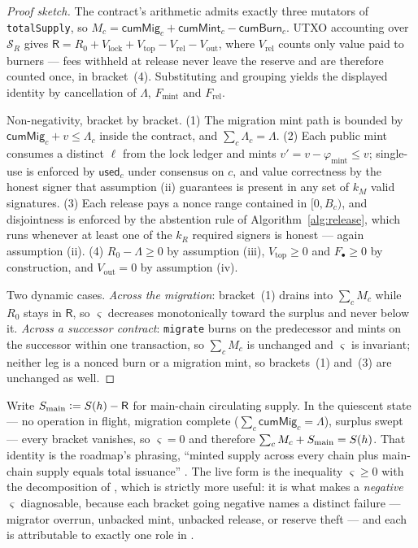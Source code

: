 \begin{proof}[Proof sketch]
The contract's arithmetic admits exactly three mutators of \texttt{totalSupply}, so
$M_c = \mathsf{cumMig}_c + \mathsf{cumMint}_c - \mathsf{cumBurn}_c$. UTXO accounting over
$\mathcal{S}_R$ gives $\mathsf{R} = R_0 + V_{\mathrm{lock}} + V_{\mathrm{top}} - V_{\mathrm{rel}}
- V_{\mathrm{out}}$, where $V_{\mathrm{rel}}$ counts only value paid to burners --- fees withheld at
release never leave the reserve and are therefore counted once, in bracket~(4). Substituting and
grouping yields the displayed identity by cancellation of $\Lambda$, $F_{\mathrm{mint}}$ and
$F_{\mathrm{rel}}$.

Non-negativity, bracket by bracket. (1) The migration mint path is bounded by
$\mathsf{cumMig}_c + v \le \Lambda_c$ inside the contract, and $\sum_c \Lambda_c = \Lambda$. (2)
Each public mint consumes a distinct $\ell$ from the lock ledger and mints $v' = v -
\varphi_{\mathrm{mint}} \le v$; single-use is enforced by $\mathsf{used}_c$ under consensus on $c$,
and value correctness by the honest signer that assumption (ii) guarantees is present in any set of
$k_M$ valid signatures. (3) Each release pays a nonce range contained in $[0, B_c)$, and
disjointness is enforced by the abstention rule of Algorithm~\ref{alg:release}, which runs whenever
at least one of the $k_R$ required signers is honest --- again assumption (ii). (4) $R_0 - \Lambda
\ge 0$ by assumption (iii), $V_{\mathrm{top}} \ge 0$ and $F_\bullet \ge 0$ by construction, and
$V_{\mathrm{out}} = 0$ by assumption (iv).

Two dynamic cases. \emph{Across the migration}: bracket~(1) drains into $\sum_c M_c$ while $R_0$
stays in $\mathsf{R}$, so $\varsigma$ decreases monotonically toward the surplus and never below it.
\emph{Across a successor contract}: \texttt{migrate} burns on the predecessor and mints on the
successor within one transaction, so $\sum_c M_c$ is unchanged and $\varsigma$ is invariant; neither
leg is a nonced burn or a migration mint, so brackets~(1) and~(3) are unchanged as well.
\end{proof}

\begin{corollary}
\label{cor:quiescent}
Write $S_{\mathrm{main}} \vcentcolon= S(h) - \mathsf{R}$ for main-chain circulating supply.
In the quiescent state --- no operation in flight, migration complete
($\sum_c \mathsf{cumMig}_c = \Lambda$), surplus swept --- every bracket vanishes, so $\varsigma = 0$
and therefore $\sum_c M_c + S_{\mathrm{main}} = S(h)$. That identity is the roadmap's
phrasing, ``minted supply across every chain plus main-chain supply equals total issuance''
. The live form is the inequality $\varsigma \ge 0$ with the
decomposition of , which is strictly more useful: it is what makes a
\emph{negative} $\varsigma$ diagnosable, because each bracket going negative names a distinct
failure --- migrator overrun, unbacked mint, unbacked release, or reserve theft --- and each is
attributable to exactly one role in . \planned
\end{corollary}

